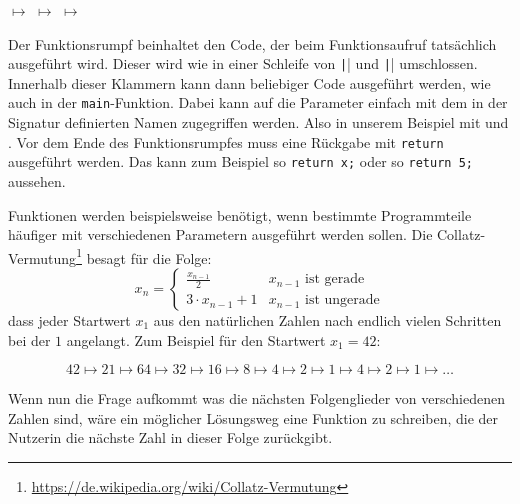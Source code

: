 \begin{center}
	 $\mapsto$  $\mapsto$  $\mapsto$ 
\end{center}


Der Funktionsrumpf beinhaltet den Code, der beim Funktionsaufruf tatsächlich ausgeführt wird.
Dieser wird wie in einer Schleife von \texttt|{| und \texttt|}| umschlossen.
Innerhalb dieser Klammern kann dann beliebiger Code ausgeführt werden, wie auch in der \texttt{main}-Funktion.
Dabei kann auf die Parameter einfach mit dem in der Signatur definierten Namen zugegriffen werden.
Also in unserem Beispiel mit  und .
Vor dem Ende des Funktionsrumpfes muss eine Rückgabe mit \texttt{return} ausgeführt werden.
Das kann zum Beispiel so \texttt{return x;} oder so \texttt{return 5;} aussehen.

Funktionen werden beispielsweise benötigt, wenn bestimmte Programmteile häufiger mit verschiedenen Parametern ausgeführt werden sollen.
Die Collatz-Vermutung\footnote{\url{https://de.wikipedia.org/wiki/Collatz-Vermutung}} besagt für die Folge:
\[
	x_n =
	\begin{cases}
		\frac{x_{n-1}}{2}   & x_{n-1} \text{ ist gerade}   \\
		3 \cdot x_{n-1} + 1 & x_{n-1} \text{ ist ungerade}
	\end{cases}
\]
dass jeder Startwert $x_1$ aus den natürlichen Zahlen nach endlich vielen Schritten bei der $1$ angelangt.
Zum Beispiel für den Startwert $x_1 = 42$:

\[
	42 \mapsto 21 \mapsto 64 \mapsto 32 \mapsto 16 \mapsto 8 \mapsto 4 \mapsto 2 \mapsto 1 \mapsto 4 \mapsto 2 \mapsto 1 \mapsto \ldots
\]

Wenn nun die Frage aufkommt was die nächsten Folgenglieder von verschiedenen Zahlen sind, wäre ein möglicher Lösungsweg eine Funktion zu schreiben, die der Nutzerin die nächste Zahl in dieser Folge zurückgibt.


